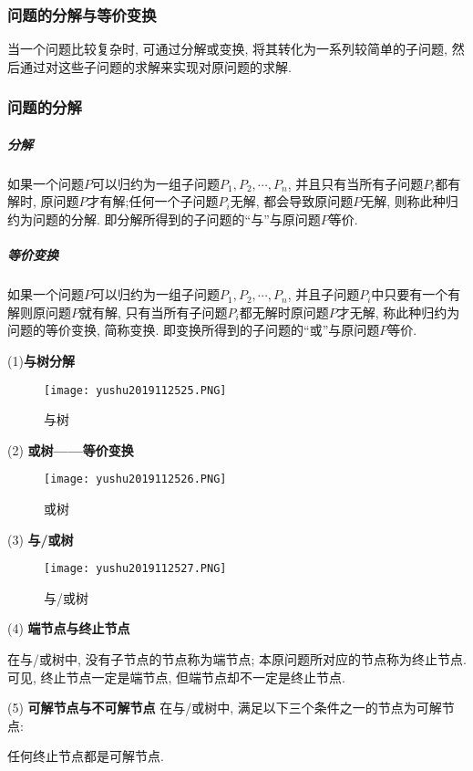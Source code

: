 \subsubsection{问题的分解与等价变换}
当一个问题比较复杂时, 可通过分解或变换, 将其转化为一系列较简单的子问题, 然后通过对这些子问题的求解来实现对原问题的求解.
\subsubsection{问题的分解}
\subparagraph{分解}
如果一个问题$P$可以归约为一组子问题$P_1,P_2,\cdots,P_n$, 并且只有当所有子问题$P_i$都有解时, 原问题$P$才有解;任何一个子问题$P_i$无解, 都会导致原问题$P$无解, 则称此种归约为问题的分解.
即分解所得到的子问题的“与”与原问题$P$等价.
\subparagraph{等价变换}
如果一个问题$P$可以归约为一组子问题$P_1,P_2,\cdots,P_n$, 并且子问题$P_i$中只要有一个有解则原问题$P$就有解, 只有当所有子问题$P_i$都无解时原问题$P$才无解, 称此种归约为问题的等价变换, 简称变换.
即变换所得到的子问题的“或”与原问题$P$等价.

(1)\textbf{与树分解}
\begin{figure}[H]
\centering
\texttt{[image: yushu2019112525.PNG]}
\caption{与树 }
\label{AI32fig25}
\end{figure}

(2) \textbf{或树——等价变换}
\begin{figure}[H]
\centering
\texttt{[image: yushu2019112526.PNG]}
\caption{或树 }
\label{AI32fig26}
\end{figure}

(3) \textbf{与/或树}
\begin{figure}[H]
\centering
\texttt{[image: yushu2019112527.PNG]}
\caption{与/或树 }
\label{AI32fig27}
\end{figure}
(4) \textbf{端节点与终止节点}

在与/或树中, 没有子节点的节点称为端节点; 本原问题所对应的节点称为终止节点. 可见, 终止节点一定是端节点, 但端节点却不一定是终止节点.

(5) \textbf{可解节点与不可解节点} 在与/或树中, 满足以下三个条件之一的节点为可解节点:

 任何终止节点都是可解节点.

